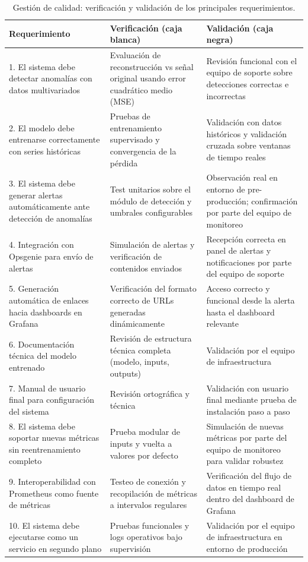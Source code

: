 \documentclass[
11pt, %
]{charter}
\begin{document}
\begin{table}[H]
\centering
\begin{tabular}{|p{4cm}|p{5cm}|p{5cm}|}
\hline
\textbf{Requerimiento} & \textbf{Verificación (caja blanca)} & \textbf{Validación (caja negra)} \\
\hline
1. El sistema debe detectar anomalías con datos multivariados & Evaluación de reconstrucción vs señal original usando error cuadrático medio (MSE) & Revisión funcional con el equipo de soporte sobre detecciones correctas e incorrectas\\
\hline
2. El modelo debe entrenarse correctamente con series históricas & Pruebas de entrenamiento supervisado y convergencia de la pérdida & Validación con datos históricos y validación cruzada sobre ventanas de tiempo reales \\
\hline
3. El sistema debe generar alertas automáticamente ante detección de anomalías & Test unitarios sobre el módulo de detección y umbrales configurables & Observación real en entorno de pre-producción; confirmación por parte del equipo de monitoreo\\
\hline
4. Integración con Opsgenie para envío de alertas & Simulación de alertas y verificación de contenidos enviados& Recepción correcta en panel de alertas y notificaciones por parte del equipo de soporte\\
\hline
5. Generación automática de enlaces hacia dashboards en Grafana & Verificación del formato correcto de URLs generadas dinámicamente & Acceso correcto y funcional desde la alerta hasta el dashboard relevante \\
\hline
6. Documentación técnica del modelo entrenado & Revisión de estructura técnica completa (modelo, inputs, outputs)& Validación por el equipo de infraestructura\\
\hline
7. Manual de usuario final para configuración del sistema & Revisión ortográfica y técnica& Validación con usuario final mediante prueba de instalación paso a paso \\
\hline
8. El sistema debe soportar nuevas métricas sin reentrenamiento completo & Prueba modular de inputs y vuelta a valores por defecto& Simulación de nuevas métricas por parte del equipo de monitoreo para validar robustez \\
\hline
9. Interoperabilidad con Prometheus como fuente de métricas & Testeo de conexión y recopilación de métricas a intervalos regulares& Verificación del flujo de datos en tiempo real dentro del dashboard de Grafana \\
\hline
10. El sistema debe ejecutarse como un servicio en segundo plano & Pruebas funcionales y logs operativos bajo supervisión& Validación por el equipo de infraestructura en entorno de producción \\
\hline
\end{tabular}
\caption{Gestión de calidad: verificación y validación de los principales requerimientos.}
\end{table}
\end{document}
